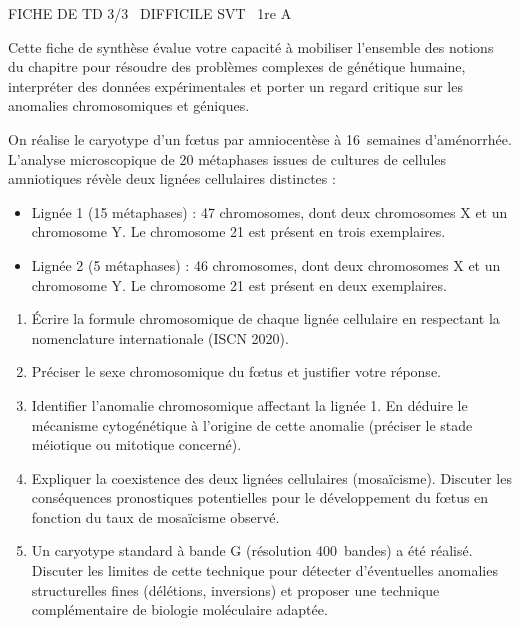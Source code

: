 \documentclass[11pt]{article}
\begin{document}
\begin{tcolorbox}[enhanced,colback=popink,colframe=popink,arc=10pt,boxrule=0pt,left=12pt,right=12pt,top=9pt,bottom=9pt]
{\color{white}\popxbold\small FICHE DE TD 3/3 \textbullet\ DIFFICILE \hfill SVT \textbullet\ 1re A\par}
\end{tcolorbox}
\vspace{4pt}
Cette fiche de synthèse évalue votre capacité à mobiliser l'ensemble des notions du chapitre pour résoudre des problèmes complexes de génétique humaine, interpréter des données expérimentales et porter un regard critique sur les anomalies chromosomiques et géniques.

\begin{exercice}
On réalise le caryotype d'un fœtus par amniocentèse à \SI{16}{semaines} d'aménorrhée. L'analyse microscopique de \num{20} métaphases issues de cultures de cellules amniotiques révèle deux lignées cellulaires distinctes :
\begin{itemize}
    \item Lignée 1 (\num{15} métaphases) : \num{47} chromosomes, dont deux chromosomes X et un chromosome Y. Le chromosome \num{21} est présent en trois exemplaires.
    \item Lignée 2 (\num{5} métaphases) : \num{46} chromosomes, dont deux chromosomes X et un chromosome Y. Le chromosome \num{21} est présent en deux exemplaires.
\end{itemize}
\begin{enumerate}
    \item Écrire la formule chromosomique de chaque lignée cellulaire en respectant la nomenclature internationale (ISCN 2020).
    \item Préciser le sexe chromosomique du fœtus et justifier votre réponse.
    \item Identifier l'anomalie chromosomique affectant la lignée 1. En déduire le mécanisme cytogénétique à l'origine de cette anomalie (préciser le stade méiotique ou mitotique concerné).
    \item Expliquer la coexistence des deux lignées cellulaires (mosaïcisme). Discuter les conséquences pronostiques potentielles pour le développement du fœtus en fonction du taux de mosaïcisme observé.
    \item Un caryotype standard à bande G (résolution \SI{400}{bandes}) a été réalisé. Discuter les limites de cette technique pour détecter d'éventuelles anomalies structurelles fines (délétions, inversions) et proposer une technique complémentaire de biologie moléculaire adaptée.
\end{enumerate}
\end{exercice}
\end{document}
